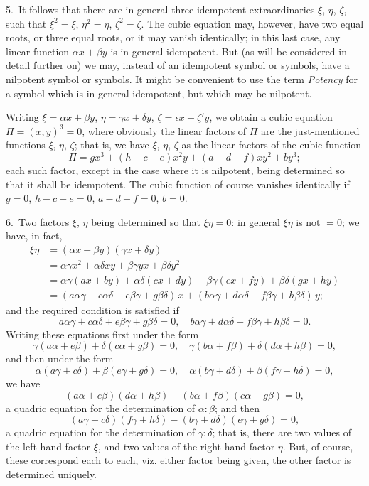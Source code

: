 \documentclass[11pt,a4paper]{book}
\begin{document}
5.~It follows that there are in general three idempotent extraordinaries $\xi$, $\eta$, $\zeta$, such that $\xi^2=\xi$, $\eta^2=\eta$, $\zeta^2=\zeta$. The cubic equation may, however, have two equal roots, or three equal roots, or it may vanish identically; in this last case, any linear function $\alpha x + \beta y$ is in general idempotent. But (as will be considered in detail further on) we may, instead of an idempotent symbol or symbols, have a nilpotent symbol or symbols. It might be convenient to use the term \textit{Potency} for a symbol which is in general idempotent, but which may be nilpotent.

Writing $\xi = \alpha x + \beta y$, $\eta = \gamma x + \delta y$, $\zeta = \epsilon x + \zeta' y$, we obtain a cubic equation $\Pi = (x,y)^3 = 0$, where obviously the linear factors of $\Pi$ are the just-mentioned functions $\xi$, $\eta$, $\zeta$; that is, we have $\xi$, $\eta$, $\zeta$ as the linear factors of the cubic function
\[
\Pi = gx^3 + (h-c-e)x^2y + (a-d-f)xy^2 + by^3;
\]
each such factor, except in the case where it is nilpotent, being determined so that it shall be idempotent. The cubic function of course vanishes identically if $g=0$, $h-c-e=0$, $a-d-f=0$, $b=0$.

6.~Two factors $\xi$, $\eta$ being determined so that $\xi\eta=0$: in general $\xi\eta$ is not $=0$; we have, in fact,
\begin{align*}
\xi\eta &= (\alpha x + \beta y)(\gamma x + \delta y) \\
&= \alpha\gamma x^2 + \alpha\delta xy + \beta\gamma yx + \beta\delta y^2 \\
&= \alpha\gamma(ax+by) + \alpha\delta(cx+dy) + \beta\gamma(ex+fy) + \beta\delta(gx+hy) \\
&= (a\alpha\gamma + c\alpha\delta + e\beta\gamma + g\beta\delta)\,x + (b\alpha\gamma + d\alpha\delta + f\beta\gamma + h\beta\delta)\,y;
\end{align*}
and the required condition is satisfied if
\[
a\alpha\gamma + c\alpha\delta + e\beta\gamma + g\beta\delta = 0,\quad b\alpha\gamma + d\alpha\delta + f\beta\gamma + h\beta\delta = 0.
\]
Writing these equations first under the form
\[
\gamma(a\alpha + e\beta) + \delta(c\alpha + g\beta) = 0,\quad \gamma(b\alpha + f\beta) + \delta(d\alpha + h\beta) = 0,
\]
and then under the form
\[
\alpha(a\gamma + c\delta) + \beta(e\gamma + g\delta) = 0,\quad \alpha(b\gamma + d\delta) + \beta(f\gamma + h\delta) = 0,
\]
we have
\[
(a\alpha + e\beta)(d\alpha + h\beta) - (b\alpha + f\beta)(c\alpha + g\beta) = 0,
\]
a quadric equation for the determination of $\alpha:\beta$; and then
\[
(a\gamma + c\delta)(f\gamma + h\delta) - (b\gamma + d\delta)(e\gamma + g\delta) = 0,
\]
a quadric equation for the determination of $\gamma:\delta$; that is, there are two values of the left-hand factor $\xi$, and two values of the right-hand factor $\eta$. But, of course, these correspond each to each, viz. either factor being given, the other factor is determined uniquely.
\end{document}
